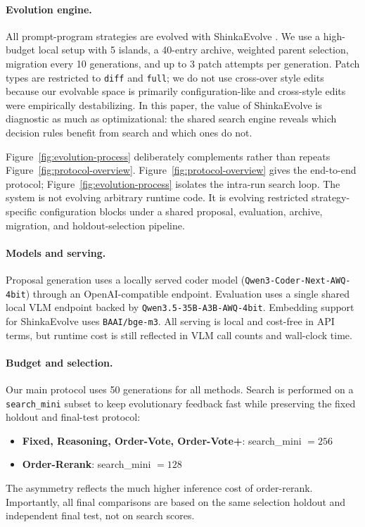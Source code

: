 \documentclass[11pt]{article}
\begin{document}
\paragraph{Evolution engine.}
All prompt-program strategies are evolved with ShinkaEvolve \citep{lange2025shinkaevolve}. We use a high-budget local setup with 5 islands, a 40-entry archive, weighted parent selection, migration every 10 generations, and up to 3 patch attempts per generation. Patch types are restricted to \texttt{diff} and \texttt{full}; we do not use cross-over style edits because our evolvable space is primarily configuration-like and cross-style edits were empirically destabilizing. In this paper, the value of ShinkaEvolve is diagnostic as much as optimizational: the shared search engine reveals which decision rules benefit from search and which ones do not.

Figure~\ref{fig:evolution-process} deliberately complements rather than repeats Figure~\ref{fig:protocol-overview}. Figure~\ref{fig:protocol-overview} gives the end-to-end protocol; Figure~\ref{fig:evolution-process} isolates the intra-run search loop. The system is not evolving arbitrary runtime code. It is evolving restricted strategy-specific configuration blocks under a shared proposal, evaluation, archive, migration, and holdout-selection pipeline.

\paragraph{Models and serving.}
Proposal generation uses a locally served coder model (\texttt{Qwen3-Coder-Next-AWQ-4bit}) through an OpenAI-compatible endpoint. Evaluation uses a single shared local VLM endpoint backed by \texttt{Qwen3.5-35B-A3B-AWQ-4bit}. Embedding support for ShinkaEvolve uses \texttt{BAAI/bge-m3}. All serving is local and cost-free in API terms, but runtime cost is still reflected in VLM call counts and wall-clock time.

\paragraph{Budget and selection.}
Our main protocol uses 50 generations for all methods. Search is performed on a \texttt{search\_mini} subset to keep evolutionary feedback fast while preserving the fixed holdout and final-test protocol:
\begin{itemize}[leftmargin=1.5em]
    \item \textbf{Fixed, Reasoning, Order-Vote, Order-Vote+}: search\_mini $=256$
    \item \textbf{Order-Rerank}: search\_mini $=128$
\end{itemize}
The asymmetry reflects the much higher inference cost of order-rerank. Importantly, all final comparisons are based on the same selection holdout and independent final test, not on search scores.
\end{document}
